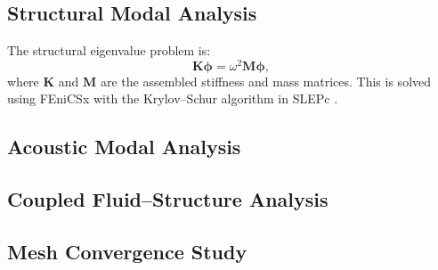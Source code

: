 \subsection{Structural Modal Analysis}

The structural eigenvalue problem is:
%
\begin{equation}
  \mathbf{K} \boldsymbol{\phi} = \omega^2 \mathbf{M} \boldsymbol{\phi},
  \label{eq:structural_eigenvalue}
\end{equation}
%
where $\mathbf{K}$ and $\mathbf{M}$ are the assembled stiffness and mass
matrices. This is solved using FEniCSx \citep{Baratta2023} with the
Krylov--Schur algorithm in SLEPc \citep{Hernandez2005}.


\subsection{Acoustic Modal Analysis}


\subsection{Coupled Fluid--Structure Analysis}


\subsection{Mesh Convergence Study}

